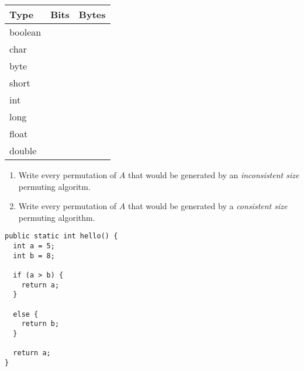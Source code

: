 \documentclass[11pt,addpoints]{exam}
\begin{document}
\begin{questions}


\begin{table}[H]
\centering
\begin{tabular}{|l|l|l|}
  \hline
  Type & Bits & Bytes \\ \hline
  boolean && \\ \hline
  char && \\ \hline
  byte && \\ \hline
  short && \\ \hline
  int && \\ \hline
  long && \\ \hline
  float && \\ \hline
  double && \\ \hline
\end{tabular}
\end{table}



\begin{enumerate}[label=(\Alph*)]
  \item Write every permutation of $A$ that would be generated by an \textit{inconsistent size} permuting algoritm.


  \item Write every permutation of $A$ that would be generated by a \textit{consistent size} permuting algorithm.
    
\end{enumerate}

\begin{minipage}{\textwidth}

\begin{verbatim}
public static int hello() {
  int a = 5;
  int b = 8;

  if (a > b) {
    return a;
  }

  else {
    return b;
  }

  return a;
}
\end{verbatim}
\end{minipage}


\end{questions}
\end{document}
